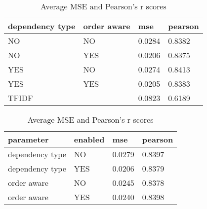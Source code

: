 \begin{table}[htb!]
  \centering
  \begin{subtable}[c]{\textwidth}
  	\centering
    \begin{tabularx}{\textwidth}{|X X|X|X|}
      \hline
      dependency type & order aware & mse & pearson \\ \hline \hline
      NO & NO & 0.0284 & 0.8382 \\ 
      NO & YES & 0.0206 & 0.8375 \\
      YES & NO & 0.0274 & 0.8413 \\
      YES & YES & 0.0205 & 0.8383 \\ \hline
      \multicolumn{2}{|l|}{TFIDF} & 0.0823 & 0.6189 \\ \hline
    \end{tabularx}
    \caption{scores aggregated by setting}
    \label{tab:results}
  \end{subtable}
  \vspace*{0.8 cm} \newline
  \begin{subtable}[c]{\textwidth}
    \centering
      \begin{tabularx}{\textwidth}{|X X|X|X|} 
        \hline
        parameter & enabled & mse & pearson \\ \hline \hline
        dependency type & NO & 0.0279 & 0.8397 \\
        dependency type & YES & 0.0206 & 0.8379 \\ \hline
        order aware & NO & 0.0245 & 0.8378 \\
        order aware & YES & 0.0240 & 0.8398 \\ \hline
      \end{tabularx}
    \caption{scores aggregated by individual parameter assignment}
    \label{tab:results_merged}
  \end{subtable}
  \caption{Average \ac{MSE} and Pearson's r scores}
\end{table}


